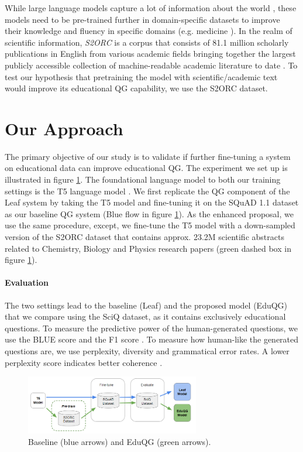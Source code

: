 \documentclass[letterpaper]{article} %
\begin{document}
While large language models capture a lot of information about the world \cite{raffel2020exploring}, these models need to be pre-trained further in domain-specific datasets to improve their knowledge and fluency in specific domains (e.g. medicine \cite{https://doi.org/10.48550/arxiv.2109.04588}). In the realm of scientific information, \emph{S2ORC} is a corpus that consists of 81.1 million scholarly publications in English from various academic fields bringing together the largest publicly accessible collection of machine-readable academic literature to date \cite{lo-etal-2020-s2orc}. To test our hypothesis that pretraining the model with scientific/academic text would improve its educational QG capability, we use the S2ORC dataset.

\section{Our Approach}

The primary objective of our study is to validate if further fine-tuning a system on educational data can improve educational QG. The experiment we set up is illustrated in figure \ref{fig:method}. The foundational language model to both our training settings is the T5 language model \cite{raffel2020exploring}. We first replicate the QG component of the Leaf system \cite{vachev2022leaf} by taking the T5 model and fine-tuning it on the SQuAD 1.1 dataset as our baseline QG system (Blue flow in figure \ref{fig:method}). As the enhanced proposal, we use the same procedure, except, we fine-tune the T5 model with a down-sampled version of the S2ORC dataset  that contains approx. {23.2M} scientific abstracts related to Chemistry, Biology and Physics research papers (green dashed box in figure \ref{fig:method}).

\paragraph{Evaluation}
The two settings lead to the baseline (Leaf) and the proposed model (EduQG) that we compare using the SciQ dataset, as it contains exclusively educational questions.
To measure the predictive power of the human-generated questions, we use the BLUE score and the F1 score \cite{DBLP:rajpurkar2016squad}. To measure how human-like the generated questions are, we use perplexity, diversity and grammatical error rates. A lower perplexity score indicates better coherence \cite{wang2022towards}.
\begin{figure}[]
\centering
\includegraphics[width=0.9\columnwidth,height=1.01in ]{methodology_new_v2.png}
\caption{Baseline (blue arrows) and EduQG (green arrows).}
\label{fig:method}
\end{figure}
\end{document}
